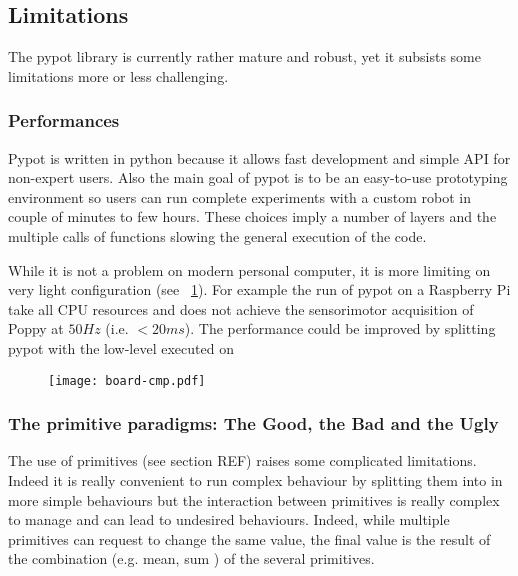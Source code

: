 \subsection{Limitations} %

The pypot library is currently rather mature and robust, yet it subsists some limitations more or less challenging.

\subsubsection{Performances}

Pypot is written in python because it allows fast development and simple API for non-expert users. Also the main goal of pypot is to be an easy-to-use prototyping environment so users can run complete experiments with a custom robot in couple of minutes to few hours. These choices imply a number of layers and the multiple calls of functions slowing the general execution of the code.

While it is not a problem on modern personal computer, it is more limiting on very light configuration (see \figurename~\ref{fig:pypot-board-comparaison}). For example the run of pypot on a Raspberry Pi take all CPU resources and does not achieve the sensorimotor acquisition of Poppy at $50Hz$ (i.e. $<20ms$).
The performance could be improved by splitting pypot with the low-level executed on

\begin{figure}[tb]
    \begin{center}
        \texttt{[image: board-cmp.pdf]}
    \end{center}
    \caption{}
    \label{fig:pypot-board-comparaison}
\end{figure}

\begin{figure}[tb]
\centering
    \hfil
    \caption{}
    \label{fig:pypot-run}
\end{figure}



\subsubsection{The primitive paradigms: The Good, the Bad and the Ugly}

The use of primitives (see section REF) raises some complicated limitations. Indeed it is really convenient to run complex behaviour by splitting them into in more simple behaviours but the interaction between primitives is really complex to manage and can lead to undesired behaviours. Indeed, while multiple primitives can request to change the same value, the final value is the result of the combination (e.g. mean, sum ) of the several primitives.

